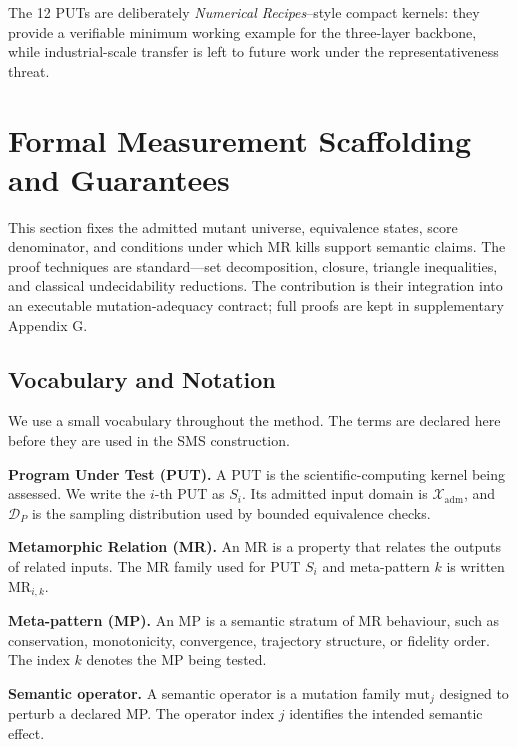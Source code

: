\documentclass[manuscript,screen,review]{acmart}
\begin{document}
The 12 PUTs are deliberately \emph{Numerical Recipes}--style compact
kernels: they provide a verifiable minimum working example for the
three-layer backbone, while industrial-scale transfer is left to future
work under the representativeness threat.


\section{Formal Measurement Scaffolding and Guarantees}
\label{formal-measurement-scaffolding}
\label{notation-and-equivalence-judgement}

This section fixes the admitted mutant universe, equivalence states,
score denominator, and conditions under which MR kills support semantic
claims. The proof
techniques are standard---set decomposition, closure, triangle
inequalities, and classical undecidability reductions. The contribution
is their integration into an executable mutation-adequacy contract;
full proofs are kept in supplementary Appendix G.

\subsection{Vocabulary and Notation}\label{vocabulary-inheritance}

We use a small vocabulary throughout the method. The terms are declared
here before they are used in the SMS construction.

\textbf{Program Under Test (PUT).} A PUT is the scientific-computing
kernel being assessed. We write the \(i\)-th PUT as \(S_i\).
Its admitted input domain is \(\mathcal{X}_{\mathrm{adm}}\), and
\(\mathcal{D}_P\) is the sampling distribution used by bounded
equivalence checks.

\textbf{Metamorphic Relation (MR).} An MR is a property that relates the
outputs of related inputs. The MR family used for PUT \(S_i\) and
meta-pattern \(k\) is written \(\mathrm{MR}_{i,k}\).

\textbf{Meta-pattern (MP).} An MP is a semantic stratum of MR behaviour,
such as conservation, monotonicity, convergence, trajectory structure, or
fidelity order. The index \(k\) denotes the MP being tested.

\textbf{Semantic operator.} A semantic operator is a mutation family
\(\mathrm{mut}_j\) designed to perturb a declared MP. The operator index
\(j\) identifies the intended semantic effect.
\end{document}
